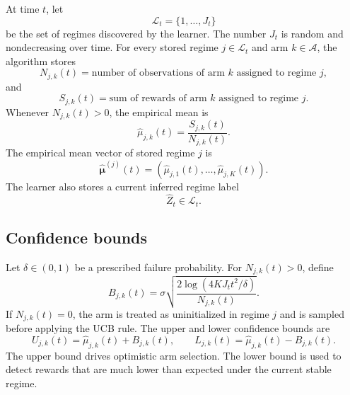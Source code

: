 \documentclass[11pt]{article}
\newcommand{\A}{\mathcal A}
\begin{document}
At time $t$, let
\begin{equation}
\label{eq:library_set}
\mathcal L_t=\{1,\ldots,J_t\}
\end{equation}
be the set of regimes discovered by the learner. The number $J_t$ is random and nondecreasing over time. For every stored regime $j\in\mathcal L_t$ and arm $k\in\A$, the algorithm stores
\begin{equation}
\label{eq:count_statistic}
N_{j,k}(t)
=
\text{number of observations of arm }k\text{ assigned to regime }j,
\end{equation}
and
\begin{equation}
\label{eq:sum_statistic}
S_{j,k}(t)
=
\text{sum of rewards of arm }k\text{ assigned to regime }j.
\end{equation}
Whenever $N_{j,k}(t)>0$, the empirical mean is
\begin{equation}
\label{eq:empirical_mean}
\widehat\mu_{j,k}(t)
=
\frac{S_{j,k}(t)}{N_{j,k}(t)}.
\end{equation}
The empirical mean vector of stored regime $j$ is
\begin{equation}
\label{eq:empirical_mean_vector}
\widehat{\bm\mu}^{(j)}(t)
=
(\widehat\mu_{j,1}(t),\ldots,\widehat\mu_{j,K}(t)).
\end{equation}
The learner also stores a current inferred regime label
\begin{equation}
\label{eq:inferred_regime}
\widehat Z_t\in\mathcal L_t.
\end{equation}

\subsection{Confidence bounds}
\label{subsec:confidence_bounds}

Let $\delta\in(0,1)$ be a prescribed failure probability. For $N_{j,k}(t)>0$, define
\begin{equation}
\label{eq:confidence_radius}
B_{j,k}(t)
=
\sigma
\sqrt{
\frac{2\log\left(4KJ_t t^2/\delta\right)}
{N_{j,k}(t)}
}.
\end{equation}
If $N_{j,k}(t)=0$, the arm is treated as uninitialized in regime $j$ and is sampled before applying the UCB rule. The upper and lower confidence bounds are
\begin{equation}
\label{eq:upper_lower_bounds}
U_{j,k}(t)=\widehat\mu_{j,k}(t)+B_{j,k}(t),
\qquad
L_{j,k}(t)=\widehat\mu_{j,k}(t)-B_{j,k}(t).
\end{equation}
The upper bound drives optimistic arm selection. The lower bound is used to detect rewards that are much lower than expected under the current stable regime.
\end{document}
